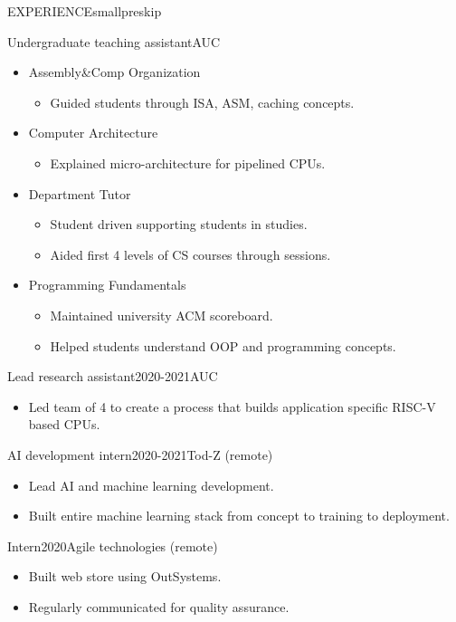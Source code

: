 \documentclass{resume}
\begin{document}
\begin{minipage}[t]{0.44\textwidth}
\begin{rsection}{\MakeUppercase{experience}}{smallpreskip}
		\begin{rcontent}{Undergraduate teaching assistant}{}{AUC}
			\begin{itemize}
				\item Assembly\&Comp Organization 
				\begin{itemize}
					\item Guided students through ISA, ASM, caching concepts.
				\end{itemize}
				\item Computer Architecture 
				\begin{itemize}
					\item Explained micro-architecture for pipelined CPUs.
				\end{itemize}
				\item Department Tutor 
				\begin{itemize}
					\item Student driven  supporting students in studies.
					\item Aided first 4 levels of CS courses through sessions.
				\end{itemize}
				\item Programming Fundamentals 
				\begin{itemize}[after=]
					\item Maintained university ACM scoreboard.
					\item Helped students understand OOP and programming concepts.
				\end{itemize}
			\end{itemize}
		\end{rcontent}
		\divider
		\begin{rcontent}{Lead research assistant}{2020-2021}{AUC}
			\begin{itemize}
				\item Led team of 4 to create a process that builds application specific RISC-V based CPUs.
			\end{itemize}
		\end{rcontent}
		\divider
		\begin{rcontent}{AI development intern}{2020-2021}{Tod-Z (remote)}
			\begin{itemize}
				\item Lead AI and machine learning development.
				\item Built entire machine learning stack from concept to training to deployment.
			\end{itemize}
		\end{rcontent}
		\divider
		\begin{rcontent}{Intern}{2020}{Agile technologies (remote)}
			\begin{itemize}
				\item Built web store using OutSystems.
				\item Regularly communicated for quality assurance.
			\end{itemize}
		\end{rcontent}


\end{rsection}
\end{minipage}
\end{document}
